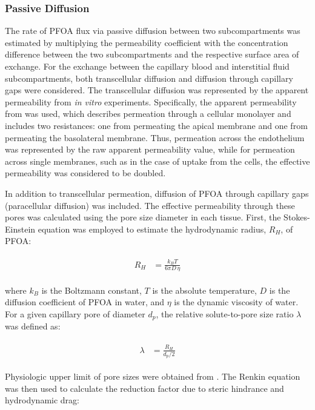\documentclass[preprint,12pt,authoryear]{elsarticle}
\begin{document}
\subsubsection{Passive Diffusion}
\label{PFOA_diffusion}
The rate of PFOA flux via passive diffusion between two subcompartments was estimated by multiplying the permeability coefficient with the concentration difference between the two subcompartments and the respective surface area of exchange. For the exchange between the capillary blood and interstitial fluid subcompartments, both transcellular diffusion and diffusion through capillary gaps were considered. The transcellular diffusion was represented by the apparent permeability from \textit{in vitro} experiments. Specifically, the apparent permeability from \citet{ryu_2024} was used, which describes permeation through a cellular monolayer and includes two resistances: one from permeating the apical membrane and one from permeating the basolateral membrane. Thus, permeation across the endothelium was represented by the raw apparent permeability value, while for permeation across single membranes, such as in the case of uptake from the cells, the effective permeability was considered to be doubled. 

In addition to transcellular permeation, diffusion of PFOA through capillary gaps (paracellular diffusion) was included. The effective permeability through these pores was calculated using the pore size diameter in each tissue. First, the Stokes-Einstein equation was employed to estimate the hydrodynamic radius, $R_{H}$, of PFOA:

\begin{align}
\begin{aligned}
R_{H} &= \frac{k_{B}T}{6\pi D \, \eta} 
\end{aligned}
\end{align}

where $k_{B}$ is the Boltzmann constant, $T$ is the absolute temperature, $D$ is the diffusion coefficient of PFOA in water, and $\eta$ is the dynamic viscosity of water. For a given capillary pore of diameter $d_{p}$, the relative solute-to-pore size ratio $\lambda$ was defined as:

\begin{align}
\begin{aligned}
\lambda &= \frac{R_{H}}{d_{p}/2}
\end{aligned}
\end{align}

Physiologic upper limit of pore sizes were obtained from \citet{sarin_2010}. The Renkin equation \citep{renkin_1954} was then used to calculate the reduction factor due to steric hindrance and hydrodynamic drag:
\end{document}
